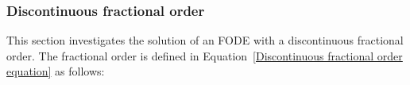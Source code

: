 \documentclass[11pt]{article}
\begin{document}
 

      
       





\subsubsection{Discontinuous fractional order}
      

This section investigates the solution of an FODE with a discontinuous fractional order. The fractional order is defined in Equation~\ref{Discontinuous fractional order equation} as follows:
\end{document}
